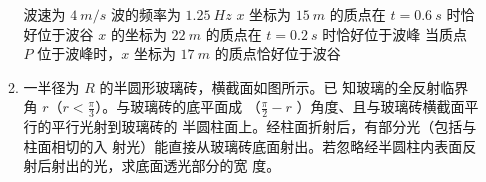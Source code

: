 \begin{enumerate}
\begin{enumerate}
\fivechoices
{波速为 $ 4 \ m /s $}
{波的频率为 $ 1.25 \ Hz $}
{$ x $ 坐标为 $ 15 \ m $ 的质点在 $ t=0.6 \ s $ 时恰好位于波谷}
{$ x $ 的坐标为 $ 22 \ m $ 的质点在 $ t=0.2 \ s $ 时恰好位于波峰}
{当质点 $ P $ 位于波峰时，$ x $ 坐标为 $ 17 \ m $ 的质点恰好位于波谷}



\item 
一半径为 $ R $ 的半圆形玻璃砖，横截面如图所示。已
知玻璃的全反射临界角 $ r $（$ r<\frac{\pi}{3} $）。与玻璃砖的底平面成
（$ \frac{\pi}{2} -r $ ）角度、且与玻璃砖横截面平行的平行光射到玻璃砖的
半圆柱面上。经柱面折射后，有部分光（包括与柱面相切的入
射光）能直接从玻璃砖底面射出。若忽略经半圆柱内表面反射后射出的光，求底面透光部分的宽
度。
\begin{figure}[h!]
	\flushright
	
\end{figure}



	
\end{enumerate}



	
	
	
\end{enumerate}

